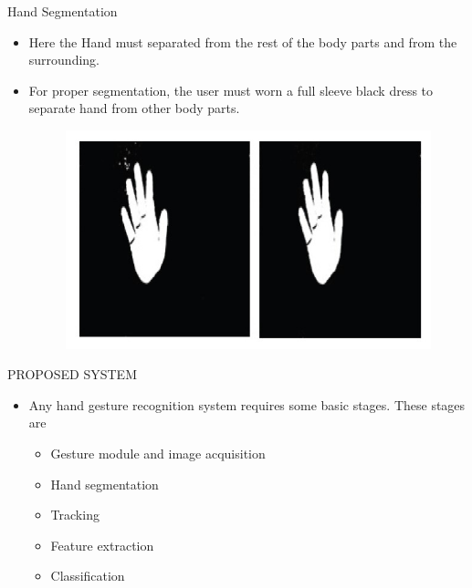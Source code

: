 \documentclass{beamer}
\begin{document}
\begin{frame}{Hand Segmentation}
 \begin{itemize}
 \item Here the Hand must separated from the rest of the body parts and from the surrounding.
 \item For proper segmentation, the user must worn a full sleeve black dress to separate hand from other body parts.
  
 \begin{figure}
  \begin{center}
  \includegraphics[scale=0.2]{images/segment.jpg}
  \end{center}
  \end{figure} 
  
\end{itemize}
\end{frame}

\begin{frame}{PROPOSED SYSTEM}
\vspace{0.5cm}
 \begin{itemize}
\item Any hand gesture recognition system requires some basic
stages. These stages are
\vspace{.5 cm}
 \begin{itemize}
\item Gesture module and image acquisition
\item Hand segmentation
\item \alert{Tracking}
\item Feature extraction
\item Classification

\end{itemize}
\end{itemize}
\end{frame} 
\end{document}
